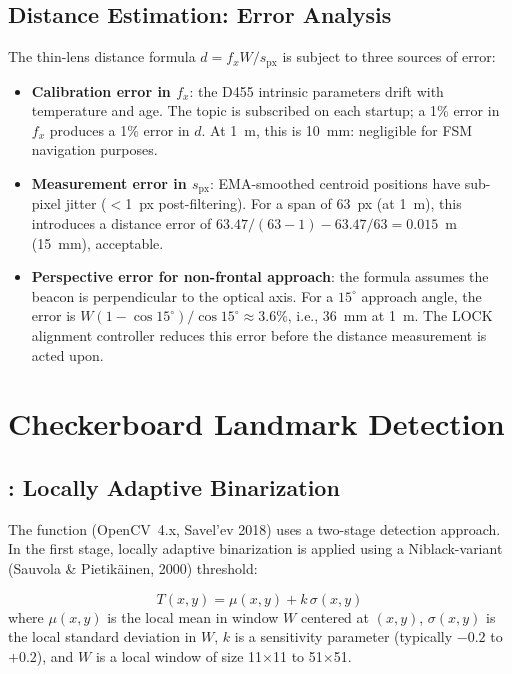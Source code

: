 \subsection{Distance Estimation: Error Analysis}

The thin-lens distance formula $d = f_x W / s_{\text{px}}$ is subject to three sources of error:

\begin{itemize}[leftmargin=1.4em]
  \item \textbf{Calibration error in $f_x$}: the D455 intrinsic parameters drift with temperature and age. The  topic is subscribed on each startup; a 1\% error in $f_x$ produces a 1\% error in $d$. At 1~m, this is 10~mm: negligible for FSM navigation purposes.
  \item \textbf{Measurement error in $s_{\text{px}}$}: EMA-smoothed centroid positions have sub-pixel jitter ($<$1~px post-filtering). For a span of 63~px (at 1~m), this introduces a distance error of $63.47/(63-1) - 63.47/63 = 0.015$~m (15~mm), acceptable.
  \item \textbf{Perspective error for non-frontal approach}: the formula assumes the beacon is perpendicular to the optical axis. For a $15^\circ$ approach angle, the error is $W(1-\cos 15^\circ)/\cos 15^\circ \approx 3.6\%$, i.e., 36~mm at 1~m. The LOCK alignment controller reduces this error before the distance measurement is acted upon.
\end{itemize}

\section{Checkerboard Landmark Detection}

\subsection{: Locally Adaptive Binarization}

The  function (OpenCV~4.x, Savel'ev 2018) uses a two-stage detection approach. In the first stage, locally adaptive binarization is applied using a Niblack-variant (Sauvola \& Pietikäinen, 2000) threshold:

\begin{eqblock}
\begin{equation}
T(x,y) = \mu(x,y) + k\,\sigma(x,y)
\end{equation}
where $\mu(x,y)$ is the local mean in window $W$ centered at $(x,y)$, $\sigma(x,y)$ is the local standard deviation in $W$, $k$ is a sensitivity parameter (typically $-0.2$ to $+0.2$), and $W$ is a local window of size 11$\times$11 to 51$\times$51.
\end{eqblock}

